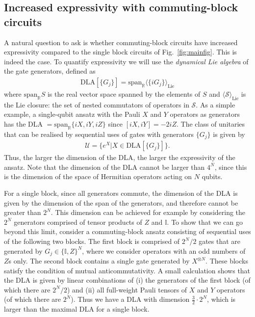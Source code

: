 \documentclass[a4paper,twocolumn,11pt]{quantumarticle}
\begin{document}
\subsection{Increased expressivity with commuting-block circuits}\label{sec:increasedexpressivity}
A natural question to ask is whether commuting-block circuits have increased expressivity compared to the single block circuits of Fig.\ \ref{fig:mainfig}. This is indeed the case. To quantify expressivity we will use the \emph{dynamical Lie algebra} \cite{ragoneunified} of the gate generators, defined as 
%
\begin{align}\label{DLA}
    \text{DLA}[\{G_j\}] = \text{span}_\mathbb{R}\langle\{iG_j\}\rangle_{\text{Lie}}
\end{align}
%
where $\text{span}_\mathbb{R} S$ is the real vector space spanned by the elements of $S$ and $\langle \mathcal{S} \rangle_{\text{Lie}}$ is the Lie closure: the set of nested commutators of operators in $\mathcal{S}$. As a simple example, a single-qubit ansatz with the Pauli $X$ and $Y$ operators as generators has the DLA $=\text{span}_\mathbb{R}\{iX,iY,iZ\}$ since $[iX,iY]=-2iZ$. The class of unitaries that can be realised by sequential uses of gates with generators $\{G_j\}$ is given by \cite{controlbook,larocca2022diagnosing}
%
\begin{align}\label{UDLA}
    \mathcal{U} = \{e^{X} \vert X\in \text{DLA}[\{G_j\}] \}.
\end{align}
%
Thus, the larger the dimension of the DLA, the larger the expressivity of the ansatz. Note that the dimension of the DLA cannot be larger than $4^N$, since this is the dimension of the space of Hermitian operators acting on $N$ qubits. 
%
%

For a single block, since all generators commute, the dimension of the DLA is given by the dimension of the span of the generators, and therefore cannot be greater than $2^N$. This dimension can be achieved for example by considering the $2^N$ generators comprised of tensor products of $Z$ and $\mathbb{I}$. 
To show that we can go beyond this limit, consider a commuting-block ansatz consisting of sequential uses of the following two blocks. The first block is comprised of $2^N/2$ gates that are generated by $G_j\in\{\mathbb{I}, Z\}^N$, where we consider operators with an odd numbers of $Z$s only. The second block contains a single gate generated by $X^{\otimes N}$.
These blocks satisfy the condition of mutual anticommutativity. A small calculation shows that the DLA is given by linear combinations of (i) the generators of the first block (of which there are $2^N/2$) and (ii) all full-weight Pauli tensors of $X$ and $Y$ operators (of which there are $2^N$). Thus we have a DLA with dimension $\frac{3}{2}\cdot 2^N$, which is larger than the maximal DLA for a single block. 
\end{document}
